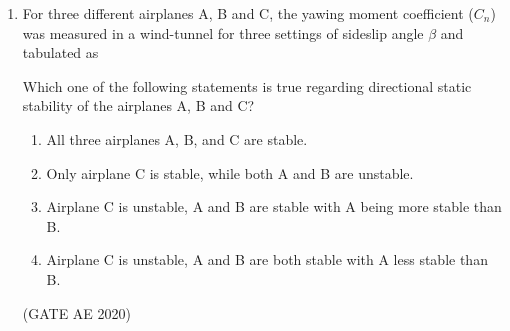 \documentclass[journal,12pt,onecolumn]{IEEEtran}
\theoremstyle{remark}
\begin{document}
\begin{enumerate}
$
\myvec{
\epsilon_{xx} \\
\epsilon_{yy} \\
\epsilon_{zz} \\
\gamma_{xy} \\
\gamma_{xz} \\
\gamma_{yz}
}
=
\myvec{
A & C & C & 0 & 0 & 0 \\
C & A & C & 0 & 0 & 0 \\
C & C & A & 0 & 0 & 0 \\
0 & 0 & 0 & B & 0 & 0 \\
0 & 0 & 0 & 0 & B & 0 \\
0 & 0 & 0 & 0 & 0 & B
}
\myvec{
\sigma_{xx} \\
\sigma_{yy} \\
\sigma_{zz} \\
\tau_{xy} \\
\tau_{xz} \\
\tau_{yz}
}
$

$A$, $B$ and $C$ are compliances which depend on the elastic properties of the material.

Which one of the following is correct?

\begin{enumerate}
\end{enumerate}
\hfill(GATE AE 2020)

\item For three different airplanes A, B and C, the yawing moment coefficient ($C_n$) was measured in a wind-tunnel for three settings of sideslip angle $\beta$ and tabulated as



Which one of the following statements is true regarding directional static stability of the airplanes A, B and C?
\begin{enumerate}
    \item All three airplanes A, B, and C are stable.
    \item Only airplane C is stable, while both A and B are unstable.
    \item Airplane C is unstable, A and B are stable with A being more stable than B.
    \item Airplane C is unstable, A and B are both stable with A less stable than B.
\end{enumerate}
\hfill(GATE AE 2020)


\end{enumerate}
\end{document}
